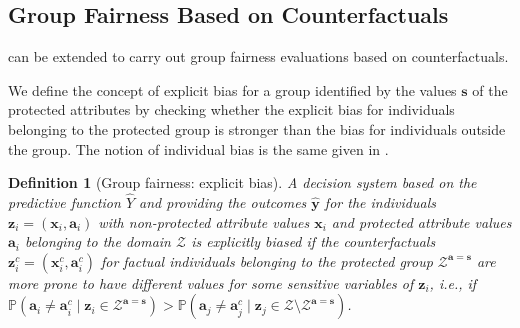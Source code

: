 \documentclass[letterpaper]{article} %
\newtheorem{definition}{Definition}
\begin{document}
\subsection{Group Fairness Based on Counterfactuals}

 can be extended to carry out group fairness evaluations based on counterfactuals.

We define the concept of explicit bias for a group identified by the values $\boldsymbol{s}$ of the protected attributes by checking whether the explicit bias for individuals belonging to the protected group is stronger than the bias for individuals outside the group.
%
The notion of individual bias is the same given in .
%
\begin{definition}[Group fairness: explicit bias]\label{explicit_bias_group}
	A decision system based on the predictive function $\hat{Y}$ and providing the outcomes $\boldsymbol{\hat{y}}$ for the individuals $\boldsymbol{z}_i = (\boldsymbol{x}_i, \boldsymbol{a}_i)$ with non-protected attribute values $\boldsymbol{x}_{i}$ and protected attribute values $\boldsymbol{a}_{i}$ belonging to the domain $\mathcal{Z}$ is \emph{explicitly biased} if the counterfactuals $\boldsymbol{z}_i^c = (\boldsymbol{x}_i^c, \boldsymbol{a}_i^c)$ for factual individuals belonging to the protected group $\mathcal{Z}^{\boldsymbol{a}=\boldsymbol{s}}$ are more prone to have different values for some sensitive variables of $\boldsymbol{z}_i$, i.e., if $\mathbb{P}(\boldsymbol{a}_{i} \neq \boldsymbol{a}_{i}^{c} \mid \boldsymbol{z}_i \in \mathcal{Z}^{\boldsymbol{a}=\boldsymbol{s}}) > \mathbb{P}(\boldsymbol{a}_{j} \neq \boldsymbol{a}_{j}^{c} \mid \boldsymbol{z}_j \in \mathcal{Z} \setminus \mathcal{Z}^{\boldsymbol{a}=\boldsymbol{s}})$.
\end{definition}
\end{document}
